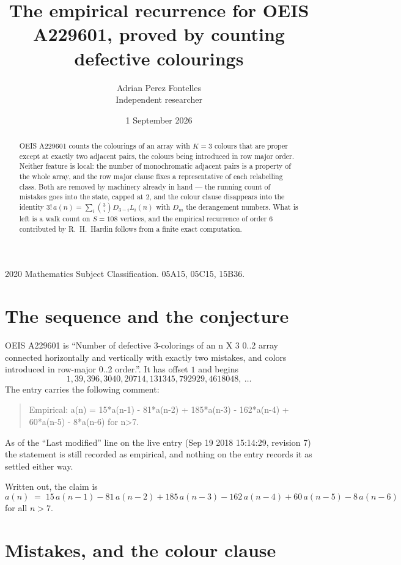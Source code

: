 \documentclass[11pt,a4paper]{article}
\title{The empirical recurrence for OEIS A229601, proved by counting defective colourings}
\author{Adrian Perez Fontelles\\ \small Independent researcher}
\date{1 September 2026}
\theoremstyle{plain}
\theoremstyle{definition}
\begin{document}
\maketitle

\begin{abstract}
OEIS A229601 counts the colourings of an array with $K=3$ colours that are proper except at
exactly two adjacent pairs, the colours being introduced in row
major order. Neither feature is local: the number of monochromatic adjacent pairs is a
property of the whole array, and the row major clause fixes a representative of each
relabelling class. Both are removed by machinery already in hand --- the running count of
mistakes goes into the state, capped at $2$, and the colour clause disappears into the
identity $3!\,a(n)=\sum_i\binom{3}{i}D_{3-i}L_i(n)$ with $D_m$ the derangement
numbers. What is left is a walk count on $S=108$ vertices, and the empirical recurrence of
order $6$ contributed by R.~H.~Hardin follows from a finite exact computation.
\end{abstract}

\noindent\small 2020 Mathematics Subject Classification. 05A15, 05C15, 15B36.\normalsize

\section{The sequence and the conjecture}

OEIS A229601 is ``Number of defective 3-colorings of an n X 3 0..2 array connected horizontally and vertically with exactly two mistakes, and colors introduced in row-major 0..2 order.''. It has offset $1$ and begins
\[
1, 39, 396, 3040, 20714, 131345, 792929, 4618048,\ \dots
\]
The entry carries the following comment:
\begin{quote}\small
Empirical: a(n) = 15*a(n-1) - 81*a(n-2) + 185*a(n-3) - 162*a(n-4) + 60*a(n-5) - 8*a(n-6) for n>7.
\end{quote}
As of the ``Last modified'' line on the live entry (Sep 19 2018 15:14:29, revision 7) the statement is
still recorded as empirical, and nothing on the entry records it as settled either way.

Written out, the claim is
\begin{equation}\label{eq:conj}
a(n)\;=\;15\,a(n-1) - 81\,a(n-2) + 185\,a(n-3) - 162\,a(n-4) + 60\,a(n-5) - 8\,a(n-6)
\end{equation}
for all $n>7$.

\section{Mistakes, and the colour clause}
\end{document}
